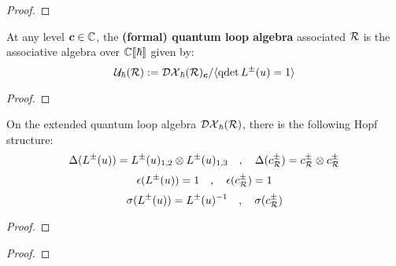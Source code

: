         \begin{lemma} \label{lemma: centres_of_extended_loop_QUEs}
        \end{lemma}
            \begin{proof}
                
            \end{proof}
        \begin{definition} \label{def: loop_QUEs_R_matrix_presentation}
            At any level $\boldsymbol{c} \in \mathbb{C}$, the \textbf{(formal) quantum loop algebra} associated $\mathcal{R}$ is the associative algebra over $\mathbb{C}[\![\hbar]\!]$ given by:
                $$\mathcal{U}_{\hbar}(\mathcal{R}) := \mathcal{DX}_{\hbar}(\mathcal{R})_{\boldsymbol{c}}/\langle\operatorname{qdet} L^{\pm}(u) = 1\rangle$$
        \end{definition}

        \begin{proposition} \label{prop: PBW_for_loop_QUEs}
            
        \end{proposition}
            \begin{proof}
                
            \end{proof}

        \begin{lemma} \label{lemma: hopf_structure_on_extended_loop_QUEs}
            On the extended quantum loop algebra $\mathcal{DX}_{\hbar}(\mathcal{R})$, there is the following Hopf structure:
                \begin{equation} \label{equation: extended_loop_QUEs_coproducts}
                    \Delta( L^{\pm}(u) ) = L^{\pm}(u)_{1, 2} \tensor L^{\pm}(u)_{1, 3} \quad, \quad \Delta( c_{\calR}^{\pm} ) = c_{\calR}^{\pm} \tensor c_{\calR}^{\pm}
                \end{equation}
                \begin{equation} \label{equation: extended_Loop_QUEs_counits}
                    \epsilon( L^{\pm}(u) ) = 1 \quad, \quad \epsilon( c_{\mathcal{R}}^{\pm} ) = 1
                \end{equation}
                \begin{equation} \label{equation: extended_Loop_QUEs_antipodes}
                    \sigma( L^{\pm}(u) ) = L^{\pm}(u)^{-1} \quad, \quad \sigma( c_{\mathcal{R}}^{\pm} )
                \end{equation}
        \end{lemma}
            \begin{proof}
                
            \end{proof}
        \begin{corollary} \label{coro: hopf_structure_on_loop_QUEs}
            
        \end{corollary}
            \begin{proof}
                
            \end{proof}

